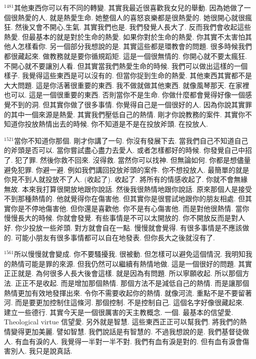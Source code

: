 \documentclass{book}
\begin{document}
$^{1481}$其他東西你可以有不同的轉變.
其實我最近很喜歡我女兒的舉動.
因為她做了一個很熱愛的人.
就是熱愛生命.
她整個人的喜怒哀樂都是很熱愛的.
她很開心就很瘋狂.
然後又會不開心,生氣.
其實我們也是.
我們發覺人長大了.
反而我們會收起這些熱愛.
但最基本的就是對於生命的熱愛.
如果你對於生命的熱愛.
你其實不太害怕其他人怎樣看你.
另一個部分我想說的是.
其實這些都是環教會的問題.
很多時候我們都很藏起來.
做教務就是要你循規蹈矩.
這是一個很無情的.
你開心就不要太瘋狂.
不開心就不要讓別人看.
但其實當我們熱愛生命的時候.
我們可以做出這樣的一個樣子.
我覺得這些東西是可以沒有的.
但當你捉到生命的熱愛.
其他東西其實都不是大大問題.
這是你活著很重要的東西.
我不做就做其他東西.
就像風琴那天.
在家裡也可以.
這是一個很重要的東西.
否則當你不是生命.
你做什麼都會覺得好像一個感覺不到的洞.
但其實你做了很多事情.
你覺得自己是一個很好的人.
因為你說其實罪的其中一個來源是熱愛.
其實我們壓低自己的熱情.
剛才你說教務的案件.
其實你不知道你投放熱情出去的時候.
你不知道是不是在投放斧頭.
在投放人.

$^{1521}$當你不知道你那個.
剛才你講了一句.
你沒有發展下去.
當我們自己不知道自己的斧頭是否可以.
當你嘗試盡心盡力去愛人.
或者怎樣都好的時候.
你發覺自己中招了.
犯了罪.
然後你救不回來.
沒得救.
當然你可以找神.
但無論如何.
你都是想儘量避免犯罪.
你避一避.
例如我們講回投放斧頭的案件.
你不想投放人.
最簡單的就是你見不到人就投放不了人.
(收起了).
收起了.
將所有的情感收起了.
你就不會無緣無故.
本來我打算很開放地跟你說話.
然後我很熱情地跟你說話.
原來那個人是接受不到那種熱情的.
他就覺得你在傷害他.
但其實你是很嘗試地跟你的朋友相處.
但其實你是不停地傷害他.
但你還是喜歡他.
你不是有心傷害他.
而是對他很熱情.
當你慢慢長大的時候.
你就會發覺.
有些事情是不可以太開放的.
你不開放反而是對人好.
你少投放一些斧頭.
對方就會自在一點.
慢慢就會覺得.
有很多事情是不應該做的.
可能小朋友有很多事情都可以自在地發表.
但你長大之後就沒有了.

$^{1561}$所以慢慢就會變成.
你不要騷擾我.
很被動.
但怎樣可以避免這個情況.
我明知我的熱情可能是罪的來源.
但我仍然可以繼續有熱情地做.
這是一個很好的問題.
其實正正就是.
為何很多人長大後會這樣.
就是因為有問題.
所以寧願收起.
所以那個方法.
正正不是收起.
而是增加那個熱情.
那個方法不是減低自己的熱情.
而是讓那個熱情更加有效地發揮出來.
令你不需要收起你的熱情.
就像河流.
重點不是不要留著河.
而是要更加控制住這條河.
那個控制.
不是控制自己.
這個名字好像很藏起來.
建立一些德行.
其實今天是一個很厲害的天主教概念.
一個.
最基本的信望愛.
Theological virtue 信望愛.
另外就是智慧.
這些東西正正可以幫我們.
將我們的熱情變得更加美麗.
譬如智慧.
我們說話是有智慧的.
不過我想說的是.
我們基督徒做人.
有血有淚的人.
我覺得一半對一半不對.
我們有血有淚是對的.
但有血有淚會傷害別人.
我只是說真話.
\end{document}
